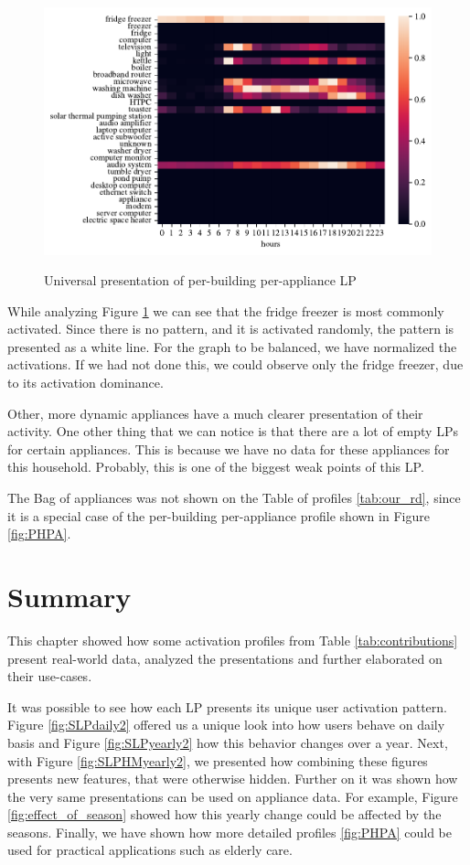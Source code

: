 \begin{figure}[H]
	\centering
	\caption{Universal presentation of per-building per-appliance LP}
	\includegraphics[width=1\textwidth]{../Figures/LPS/BOA.pdf}
	\label{fig:BOA}
\end{figure}

While analyzing Figure \ref{fig:BOA} we can see that the fridge freezer is most commonly activated.
Since there is no pattern, and it is activated randomly, the pattern is presented as a white line.
For the graph to be balanced, we have normalized the activations.
If we had not done this, we could observe only the fridge freezer, due to its activation dominance. 

Other, more dynamic appliances have a much clearer presentation of their activity. 
One other thing that we can notice is that there are a lot of empty LPs for certain appliances.
This is because we have no data for these appliances for this household.
Probably, this is one of the biggest weak points of this LP.

The Bag of appliances was not shown on the Table of profiles \ref{tab:our_rd},
since it is a special case of the per-building per-appliance profile shown in Figure \ref{fig:PHPA}.

\section{Summary}

This chapter showed how some activation profiles from Table \ref{tab:contributions} present real-world data, analyzed the presentations and further elaborated on their use-cases.

It was possible to see how each LP presents its unique user activation pattern. 
Figure \ref{fig:SLPdaily2} offered us a unique look into how users behave on daily basis and Figure \ref{fig:SLPyearly2} how this behavior changes over a year.
Next, with Figure \ref{fig:SLPHMyearly2}, we presented how combining these figures presents new features, that were otherwise hidden.
Further on it was shown how the very same presentations can be used on appliance data.
For example, Figure \ref{fig:effect_of_season} showed how this yearly change could be affected by the seasons.
Finally, we have shown how more detailed profiles \ref{fig:PHPA} could be used for practical applications such as elderly care. 